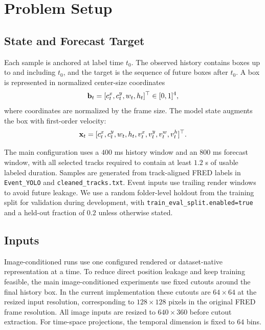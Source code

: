 \section{Problem Setup}

\subsection{State and Forecast Target}

Each sample is anchored at label time $t_0$. The observed history contains boxes up to and including $t_0$, and the target is the sequence of future boxes after $t_0$. A box is represented in normalized center-size coordinates
\begin{equation}
  \mathbf{b}_t = [c^x_t, c^y_t, w_t, h_t]^\top \in [0,1]^4,
\end{equation}
where coordinates are normalized by the frame size. The model state augments the box with first-order velocity:
\begin{equation}
  \mathbf{x}_t =
  [c^x_t, c^y_t, w_t, h_t, v^x_t, v^y_t, v^w_t, v^h_t]^\top.
\end{equation}

The main configuration uses a $400$ ms history window and an $800$ ms forecast window, with all selected tracks required to contain at least $1.2$ s of usable labeled duration. Samples are generated from track-aligned FRED labels in \texttt{Event\_YOLO} and \texttt{cleaned\_tracks.txt}. Event inputs use trailing render windows to avoid future leakage. We use a random folder-level holdout from the training split for validation during development, with \texttt{train\_eval\_split.enabled=true} and a held-out fraction of $0.2$ unless otherwise stated.

\subsection{Inputs}

Image-conditioned runs use one configured rendered or dataset-native representation at a time. To reduce direct position leakage and keep training feasible, the main image-conditioned experiments use fixed cutouts around the final history box. In the current implementation these cutouts are $64\times64$ at the resized input resolution, corresponding to $128\times128$ pixels in the original FRED frame resolution. All image inputs are resized to $640\times360$ before cutout extraction. For time-space projections, the temporal dimension is fixed to $64$ bins.

